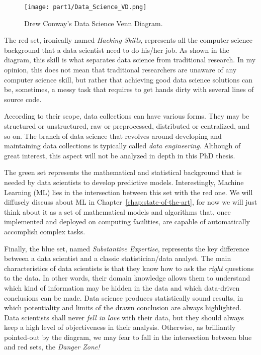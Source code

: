 \begin{figure}[h!]
	\centering
	\texttt{[image: part1/Data\_Science\_VD.png]}
	\caption{Drew Conway's Data Science Venn Diagram.} \label{fig:data_science_venn_diagram}
\end{figure}

The red set, ironically named \textit{Hacking Skills}, represents all the computer science background that a data scientist need to do his/her job. As shown in the diagram, this  skill is what separates data science from traditional research. In my opinion, this does not mean that traditional researchers are unaware of any computer science skill, but rather that achieving good data science solutions can be, sometimes, a messy task that requires to get hands dirty with several lines of source code.


According to their scope, data collections can have various forms. They may be structured or unstructured, raw or preprocessed, distributed or centralized, and so on. The branch of data science that revolves around developing and maintaining data collections is typically called \textit{data engineering}. Although of great interest, this aspect will not be analyzed in depth in this PhD thesis.

The green set represents the mathematical and statistical background that is needed by data scientists to develop predictive models. Interestingly, Machine Learning (\ac{ML}) lies in the intersection between this set with the red one. We will diffusely discuss about ML in Chapter~\ref{chap:state-of-the-art}, for now we will just think about it as a set of mathematical models and algorithms that, once implemented and deployed on computing facilities, are capable of automatically accomplish complex tasks.

Finally, the blue set, named \textit{Substantive Expertise}, represents the key difference between a data scientist and a classic statistician/data analyst. The main characteristics of data scientists is that they know how to ask the \textit{right} questions to the data. In other words, their domain knowledge allows them to understand which kind of information may be hidden in the data and which data-driven conclusions can be made. Data science produces statistically sound results, in which potentiality and limits of the drawn conclusion are always highlighted. Data scientists shall never \textit{fell in love} with their data, but they should always keep a high level of objectiveness in their analysis. Otherwise, as brilliantly pointed-out by the diagram, we may fear to fall in the intersection between blue and red sets, the \textit{Danger Zone!}



